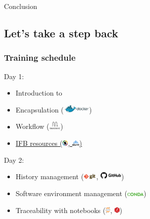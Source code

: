 \begin{frame}{}

\huge{Conclusion}

\end{frame}

\subsection{Let's take a step back}

\begin{frame}{\FAIRB}
\frametitle{Training schedule}
Day 1:
\begin{itemize}
    \item Introduction to \FAIRB
    \item Encapsulation (\includegraphics[height=0.4cm]{shared/logo-docker-paysage.png})
    \item Workflow (\includegraphics[height=0.4cm]{shared/logo-snakemake.png})
    \item \hyperlink{IFB}{IFB resources (\includegraphics[height=0.3cm]{shared/logo-singularity.png}, \includegraphics[height=0.3cm]{shared/logo-slurm.png})}
\end{itemize}
Day 2:
\begin{itemize}
    \item History management (\includegraphics[height=0.3cm]{shared/logo-git.png}, \includegraphics[height=0.4cm]{shared/logo-github.png})
    \item Software environment management (\includegraphics[height=0.2cm]{shared/logo-conda.png})
    \item Traceability with notebooks (\includegraphics[height=0.3cm]{shared/logo-jupyter.png}, \includegraphics[height=0.3cm]{shared/logo-Rmarkdown.png})

\end{itemize}
\end{frame}
